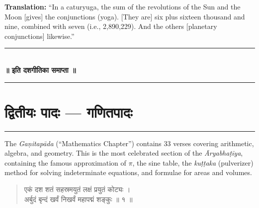 \documentclass[11pt,a4paper]{article}
\newcommand{\dev}[1]{{\devanagarifont #1}}
\newenvironment{sanskritverse}{\begin{verse}\devanagarifont\large\centering}{\end{verse}}
\begin{document}
\vspace{0.3cm}
\noindent\textbf{Translation:} ``In a caturyuga, the sum of the revolutions of the Sun and the Moon [gives] the conjunctions (yoga). [They are] six plus sixteen thousand and nine, combined with seven (i.e., 2,890,229). And the others [planetary conjunctions] likewise.''

\vspace{0.5cm}

\begin{center}
\textcolor{rulecolor}{\rule{0.6\textwidth}{0.4pt}}\\[0.5em]
\textbf{\dev{॥ इति दशगीतिका समाप्ता ॥}}\\[0.3em]
\textcolor{rulecolor}{\rule{0.6\textwidth}{0.4pt}}
\end{center}

\clearpage

\section*{\dev{द्वितीयः पादः — गणितपादः}}

\begin{center}
\textcolor{rulecolor}{\rule{0.8\textwidth}{0.6pt}}
\end{center}

\noindent
The \textit{Gaṇitapāda} (``Mathematics Chapter'') contains 33 verses covering arithmetic, algebra, and geometry. This is the most celebrated section of the \textit{Āryabhaṭīya}, containing the famous approximation of $\pi$, the sine table, the \textit{kuṭṭaka} (pulverizer) method for solving indeterminate equations, and formulae for areas and volumes.

\vspace{0.3cm}

\begin{tcolorbox}[colback=white,colframe=rulecolor,title={\dev{\textbf{गणित १ — संख्यास्थाननामानि (Names of Number Places)}}}]
\begin{sanskritverse}
\dev{एकं दश शतं सहस्रमयुतं लक्षं प्रयुतं कोट्यः ।\\
अर्बुदं बृन्दं खर्वं निखर्वं महापद्मं शङ्कुः ॥ १ ॥}
\end{sanskritverse}
\end{tcolorbox}
\end{document}
